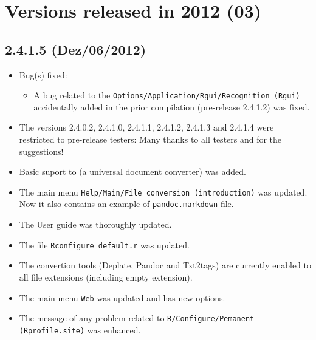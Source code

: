 
\section{Versions released in 2012 (03)}
\subsection*{2.4.1.5 (Dez/06/2012)}
\begin{itemize}
  \item Bug(s) fixed:
    \begin{itemize}
      \item A bug related to the \texttt{Options/Application/Rgui/Recognition (Rgui)} accidentally added
        in the prior compilation (pre-release 2.4.1.2) was fixed.
    \end{itemize}
  \item The versions 2.4.0.2, 2.4.1.0, 2.4.1.1, 2.4.1.2, 2.4.1.3 and 2.4.1.4 were restricted to pre-release testers:
    Many thanks to all testers and for the suggestions!
  \item Basic suport to  (a universal document converter) was added.
  \item The main menu \texttt{Help/Main/File conversion (introduction)} was updated. Now it also contains an example of \texttt{pandoc.markdown} file.
  \item The User guide was thoroughly updated.
  \item The file \texttt{Rconfigure\_default.r} was updated.
  \item The convertion tools (Deplate, Pandoc and Txt2tags) are currently enabled to all file extensions (including empty extension).
  \item The main menu \texttt{Web} was updated and has new options.
  \item The message of any problem related to \texttt{R/Configure/Pemanent (Rprofile.site)} was enhanced.
\end{itemize}


